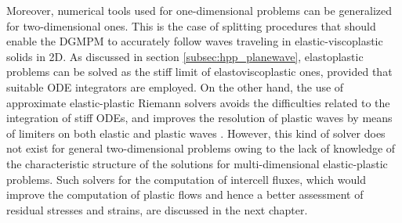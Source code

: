 Moreover, numerical tools used for one-dimensional problems can be generalized for two-dimensional ones. 
This is the case of splitting procedures that should enable the DGMPM to accurately follow waves traveling in elastic-viscoplastic solids in 2D. 
As discussed in section \ref{subsec:hpp_planewave}, elastoplastic problems can be solved as the stiff limit of elastoviscoplastic ones, provided that suitable ODE integrators are employed. %
On the other hand, the use of approximate elastic-plastic Riemann solvers avoids the difficulties related to the integration of stiff ODEs, and improves the resolution of plastic waves by means of limiters on both elastic and plastic waves \cite{Thomas_EP}.
However, this kind of solver does not exist for general two-dimensional problems owing to the lack of knowledge of the characteristic structure of the solutions for multi-dimensional elastic-plastic problems. 
Such solvers for the computation of intercell fluxes, which would improve the computation of plastic flows and hence a better assessment of residual stresses and strains, are discussed in the next chapter. 

